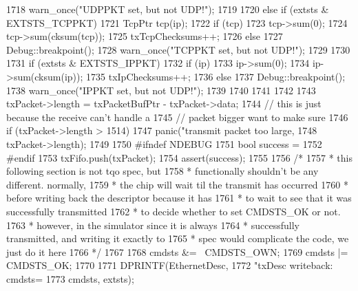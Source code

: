 \begin{DoxyCode}
{{{{{{{1718                             warn_once("UDPPKT set, but not UDP!\n");
1719                         }
1720                     } else if (extsts & EXTSTS_TCPPKT) {
1721                         TcpPtr tcp(ip);
1722                         if (tcp) {
1723                             tcp->sum(0);
1724                             tcp->sum(cksum(tcp));
1725                             txTcpChecksums++;
1726                         } else {
1727                             Debug::breakpoint();
1728                             warn_once("TCPPKT set, but not UDP!\n");
1729                         }
1730                     }
1731                     if (extsts & EXTSTS_IPPKT) {
1732                         if (ip) {
1733                             ip->sum(0);
1734                             ip->sum(cksum(ip));
1735                             txIpChecksums++;
1736                         } else {
1737                             Debug::breakpoint();
1738                             warn_once("IPPKT set, but not UDP!\n");
1739                         }
1740                     }
1741                 }
1742 
1743                 txPacket->length = txPacketBufPtr - txPacket->data;
1744                 // this is just because the receive can't handle a
1745                 // packet bigger want to make sure
1746                 if (txPacket->length > 1514)
1747                     panic("transmit packet too large, %
1748                           txPacket->length);
1749 
1750 #ifndef NDEBUG
1751                 bool success =
1752 #endif
1753                     txFifo.push(txPacket);
1754                 assert(success);
1755 
1756                 /*
1757                  * this following section is not tqo spec, but
1758                  * functionally shouldn't be any different.  normally,
1759                  * the chip will wait til the transmit has occurred
1760                  * before writing back the descriptor because it has
1761                  * to wait to see that it was successfully transmitted
1762                  * to decide whether to set CMDSTS_OK or not.
1763                  * however, in the simulator since it is always
1764                  * successfully transmitted, and writing it exactly to
1765                  * spec would complicate the code, we just do it here
1766                  */
1767 
1768                 cmdsts &= ~CMDSTS_OWN;
1769                 cmdsts |= CMDSTS_OK;
1770 
1771                 DPRINTF(EthernetDesc,
1772                         "txDesc writeback: cmdsts=%
1773                         cmdsts, extsts);
}}}}
\end{DoxyCode}
